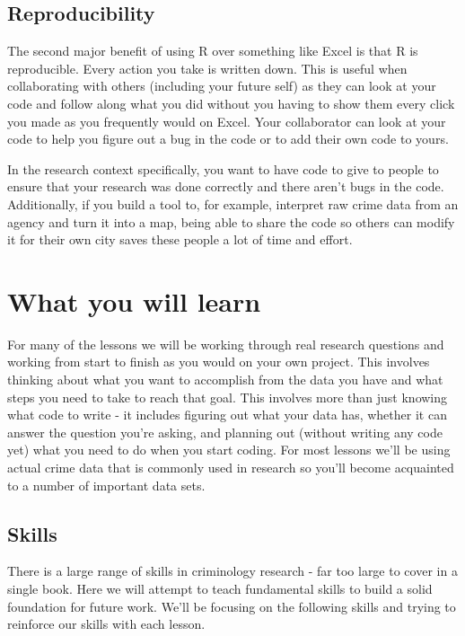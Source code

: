 \documentclass[
]{krantz}
\begin{document}
\hypertarget{reproducibility}{%
\subsection{Reproducibility}\label{reproducibility}}

The second major benefit of using R over something like Excel is that R is reproducible. Every action you take is written down. This is useful when collaborating with others (including your future self) as they can look at your code and follow along what you did without you having to show them every click you made as you frequently would on Excel. Your collaborator can look at your code to help you figure out a bug in the code or to add their own code to yours.

In the research context specifically, you want to have code to give to people to ensure that your research was done correctly and there aren't bugs in the code. Additionally, if you build a tool to, for example, interpret raw crime data from an agency and turn it into a map, being able to share the code so others can modify it for their own city saves these people a lot of time and effort.

\hypertarget{what-you-will-learn}{%
\section{What you will learn}\label{what-you-will-learn}}

For many of the lessons we will be working through real research questions and working from start to finish as you would on your own project. This involves thinking about what you want to accomplish from the data you have and what steps you need to take to reach that goal. This involves more than just knowing what code to write - it includes figuring out what your data has, whether it can answer the question you're asking, and planning out (without writing any code yet) what you need to do when you start coding. For most lessons we'll be using actual crime data that is commonly used in research so you'll become acquainted to a number of important data sets.

\hypertarget{skills}{%
\subsection{Skills}\label{skills}}

There is a large range of skills in criminology research - far too large to cover in a single book. Here we will attempt to teach fundamental skills to build a solid foundation for future work. We'll be focusing on the following skills and trying to reinforce our skills with each lesson.
\end{document}
